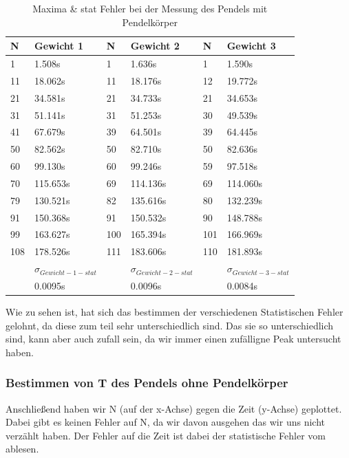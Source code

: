 \documentclass[twoside]{protokoll}
\begin{document}
\begin{table}[H]
    \centering
    \begin{tabularx}{1.0\textwidth}{X X X X X X}
       \textbf{N}  & \textbf{Gewicht 1} & \textbf{N} & \textbf{Gewicht 2} & \textbf{N} & \textbf{Gewicht 3} \\
       \toprule
       1 & 1.508s &  1 & 1.636s &  1 & 1.590s \\
       11 & 18.062s &  11 & 18.176s &  12 & 19.772s \\
       21 & 34.581s &  21 & 34.733s &  21 & 34.653s \\
       31 & 51.141s &  31 & 51.253s &  30 & 49.539s \\
       41 & 67.679s &  39 & 64.501s &  39 & 64.445s \\
       50 & 82.562s &  50 & 82.710s &  50 & 82.636s \\
       60 & 99.130s &  60 & 99.246s &  59 & 97.518s \\
       70 & 115.653s &  69 & 114.136s &  69 & 114.060s \\
       79 & 130.521s &  82 & 135.616s &  80 & 132.239s \\
       91 & 150.368s &  91 & 150.532s &  90 & 148.788s \\
       99 & 163.627s &  100 & 165.394s &  101 & 166.969s \\
       108 & 178.526s &  111 & 183.606s &  110 & 181.893s \\
       \midrule
        & \textbf{$\sigma_{Gewicht-1-stat}$} & & \textbf{$\sigma_{Gewicht-2-stat}$} & & \textbf{$\sigma_{Gewicht-3-stat}$} \\
       \midrule
        & 0.0095s & & 0.0096s & & 0.0084s \\
       \toprule
    \end{tabularx}
    \caption{Maxima \& stat Fehler bei der Messung des Pendels mit Pendelkörper}
\end{table}

Wie zu sehen ist, hat sich das bestimmen der verschiedenen Statistischen Fehler gelohnt, da diese zum teil sehr unterschiedlich sind.
Das sie so unterschiedlich sind, kann aber auch zufall sein, da wir immer einen zufälligne Peak untersucht haben.\\

\subsubsection{Bestimmen von T des Pendels ohne Pendelkörper}
Anschließend haben wir N (auf der x-Achse) gegen die Zeit (y-Achse) geplottet.
Dabei gibt es keinen Fehler auf N, da wir davon ausgehen das wir uns nicht verzählt haben.
Der Fehler auf die Zeit ist dabei der statistische Fehler vom ablesen.
\end{document}
